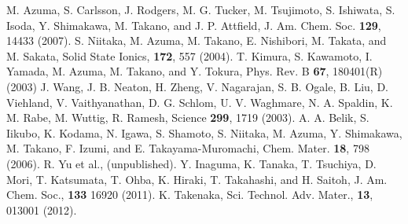 \documentclass[aps,twocolumn,prl,showpacs,preprintnumbers,amsmath,amssymb]{revtex4}
\begin{document}
\begin{thebibliography}{99}
%
M. Azuma, S. Carlsson, J. Rodgers, M. G. Tucker, M. Tsujimoto, S. Ishiwata, S. Isoda, Y. Shimakawa, M. Takano, and J. P. Attfield, J. Am. Chem. Soc. {\bf 129}, 14433 (2007). 
%
S. Niitaka, M. Azuma, M. Takano, E. Nishibori, M. Takata, and M. Sakata, Solid State Ionics, {\bf 172}, 557 (2004).
%
T. Kimura, S. Kawamoto, I. Yamada, M. Azuma, M. Takano, and Y. Tokura, Phys. Rev. B {\bf 67}, 180401(R) (2003)
%
J. Wang, J. B. Neaton, H. Zheng, V. Nagarajan, S. B. Ogale, B. Liu, D. Viehland, V. Vaithyanathan, D. G. Schlom, U. V. Waghmare, N. A. Spaldin, K. M. Rabe, M. Wuttig, R. Ramesh, Science {\bf 299}, 1719 (2003). 
%
A. A. Belik, S. Iikubo, K. Kodama, N. Igawa, S. Shamoto, S. Niitaka, M. Azuma, Y. Shimakawa, M. Takano, F. Izumi, and E. Takayama-Muromachi, Chem. Mater. {\bf 18}, 798 (2006).
%
R. Yu et al., (unpublished).
%
Y. Inaguma, K. Tanaka, T. Tsuchiya, D. Mori, T. Katsumata, T. Ohba, K. Hiraki, T. Takahashi, and H. Saitoh, J. Am. Chem. Soc., {\bf 133} 16920 (2011).
%
K. Takenaka, Sci. Technol. Adv. Mater., {\bf 13}, 013001 (2012). 
\end{thebibliography}
\end{document}
